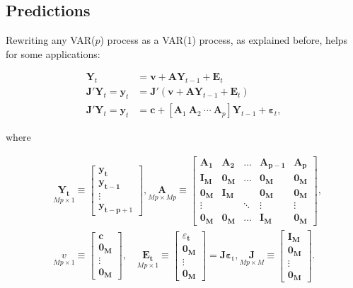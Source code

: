 \subsection{Predictions}

Rewriting any VAR($p$) process as a VAR(1) process, as explained before,  helps for some applications:

\begin{align*}
	\bm{Y}_t &= \bm{v} + \bm{AY}_{t-1} + \bm{E}_t \\
	\bm{J}'\bm{Y}_t = \bm{y}_t &= \bm{J}'(\bm{v} + \bm{AY}_{t-1} + \bm{E}_t) \\ 
	\bm{J}'\bm{Y}_t = \bm{y}_t &= \bm{c} + [\bm{A}_1 \: \bm{A}_2 \: \cdots \: \bm{A}_p]\bm{Y}_{t-1} + \bm{\varepsilon}_t,
\end{align*}

where 

\begin{align*}
& \underset{M p \times 1}{\bm{Y}_{\bm{t}}} \equiv\left[\begin{array}{c}
\bm{y}_{\bm{t}} \\
\bm{y}_{\bm{t}-\bm{1}} \\
\vdots \\
\bm{y}_{\bm{t}-\bm{p}+1}
\end{array}\right], \underset{M p \times M p}{\bm{A}} \equiv\left[\begin{array}{ccccc}
\bm{A}_{\bm{1}} & \bm{A}_{\bm{2}} & \ldots & \bm{A}_{\bm{p}-\bm{1}} & \bm{A}_{\bm{p}} \\
\bm{I}_{\bm{M}} & \bm{0}_{\bm{M}} & \ldots & \bm{0}_{\bm{M}} & \bm{0}_{\bm{M}} \\
\bm{0}_{\bm{M}} & \bm{I}_{\bm{M}} & & \bm{0}_{\bm{M}} & \bm{0}_{\bm{M}} \\
\vdots & & \ddots & \vdots & \vdots \\
\bm{0}_{\bm{M}} & \bm{0}_{\bm{M}} & \ldots & \bm{I}_{\bm{M}} & \bm{0}_{\bm{M}}
\end{array}\right] , \\
& \underset{M p \times 1}{v} \equiv\left[\begin{array}{c}
\bm{c} \\
\bm{0}_{\bm{M}} \\
\vdots \\
\bm{0}_{\bm{M}}
\end{array}\right], \quad \underset{M p \times 1}{\bm{E}_{\bm{t}}} \equiv\left[\begin{array}{c}
\varepsilon_{\bm{t}} \\
\bm{0}_{\bm{M}} \\
\vdots \\
\bm{0}_{\bm{M}}
\end{array}\right]=\bm{J} \bm{\varepsilon}_{\mathrm{t}}, \underset{M p \times M}{\bm{J}} \equiv\left[\begin{array}{c}
\bm{I}_{\bm{M}} \\
\bm{0}_{\bm{M}} \\
\vdots \\
\bm{0}_{\bm{M}}
\end{array}\right] . \\
&
\end{align*}

